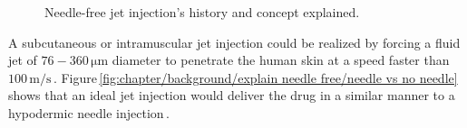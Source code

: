         \begin{figure}[!ht]
            \centering
            \qquad
            \caption{
                Needle-free jet injection's history and concept explained.
            }   \label{fig:chapter/background/explain needle free}
        \end{figure}
        
        A subcutaneous or intramuscular jet injection could be realized by forcing a fluid jet of $\mathrm{76-360\,\mu m}$  diameter to penetrate the human skin at a speed faster than $\mathrm{100 \,m/s}$\,\cite{mitragotri2006,Hogan2006}. Figure\,\ref{fig:chapter/background/explain needle free/needle vs no needle} shows that an ideal jet injection would deliver the drug in a similar manner to a hypodermic needle injection\,\cite{InsuJet2013}.
        
        
